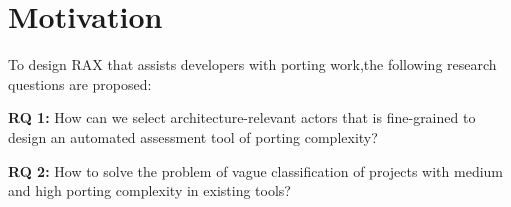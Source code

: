 \documentclass[sigconf,screen,review,anonymous]{acmart}
\begin{document}
\section{Motivation}
To design RAX that assists developers with porting work,the following research questions are proposed:

\textbf{RQ 1:} How can we select architecture-relevant actors that is fine-grained to design an automated assessment tool of porting complexity?

\textbf{RQ 2:} How to solve the problem of vague classification of projects with medium and high porting complexity in existing tools?
 
\end{document}
